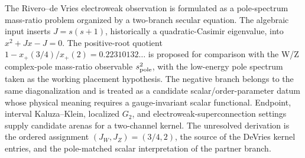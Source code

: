 The Rivero--de Vries electroweak observation is formulated as a pole-spectrum mass-ratio problem organized by a two-branch secular equation.  The algebraic input inserts \(J=s(s+1)\), historically a quadratic-Casimir eigenvalue, into \(x^2+Jx-J=0\).  The positive-root quotient \(1-x_+(3/4)/x_+(2)=0.22310132\ldots\) is proposed for comparison with the W/Z complex-pole mass-ratio observable \(s^2_{\rm pole}\), with the low-energy pole spectrum taken as the working placement hypothesis.  The negative branch belongs to the same diagonalization and is treated as a candidate scalar/order-parameter datum whose physical meaning requires a gauge-invariant scalar functional.  Endpoint, interval Kaluza--Klein, localized \(G_2\), and electroweak-superconnection settings supply candidate arenas for a two-channel kernel.  The unresolved derivation is the ordered assignment \((J_W,J_Z)=(3/4,2)\), the source of the DeVries kernel entries, and the pole-matched scalar interpretation of the partner branch.
